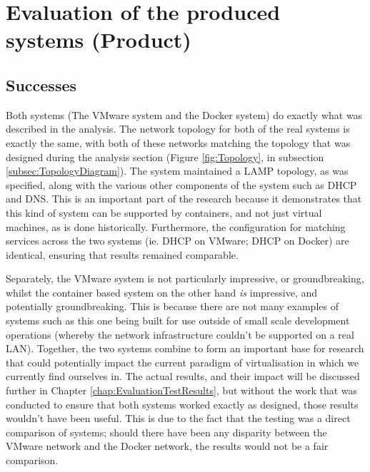 

\chapter{Evaluation of the produced systems (Product)}
\section{Successes}%
Both systems (The VMware system and the Docker system) do exactly what was described in the analysis. The network topology for both of the real systems is exactly the same, with both of these networks matching the topology that was designed during the analysis section (Figure \ref{fig:Topology}, in subsection \ref{subsec:TopologyDiagram}). The system maintained a LAMP topology, as was specified, along with the various other components of the system such as DHCP and DNS. This is an important part of the research because it demonstrates that this kind of system can be supported by containers, and not just virtual machines, as is done historically. Furthermore, the configuration for matching services across the two systems (ie. DHCP on VMware; DHCP on Docker) are identical, ensuring that results remained comparable.

Separately, the VMware system is not particularly impressive, or groundbreaking, whilst the container based system on the other hand \emph{is} impressive, and potentially groundbreaking. This is because there are not many examples of systems such as this one being built for use outside of small scale development operations (whereby the network infrastructure couldn't be supported on a real LAN). Together, the two systems combine to form an important base for research that could potentially impact the current paradigm of virtualisation in which we currently find ourselves in. The actual results, and their impact will be discussed further in Chapter \ref{chap:EvaluationTestResults}, but without the work that was conducted to ensure that both systems worked exactly as designed, those results wouldn't have been useful. This is due to the fact that the testing was a direct comparison of systems; should there have been any disparity between the VMware network and the Docker network, the results would not be a fair comparison.

